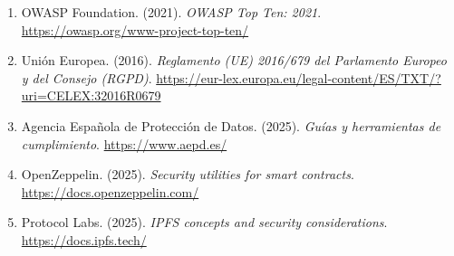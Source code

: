 \documentclass[11pt, a4paper]{article}
\begin{document}
\begin{enumerate}
    \item OWASP Foundation. (2021). \textit{OWASP Top Ten: 2021}. \url{https://owasp.org/www-project-top-ten/}
    \item Unión Europea. (2016). \textit{Reglamento (UE) 2016/679 del Parlamento Europeo y del Consejo (RGPD)}. \url{https://eur-lex.europa.eu/legal-content/ES/TXT/?uri=CELEX:32016R0679}
    \item Agencia Española de Protección de Datos. (2025). \textit{Guías y herramientas de cumplimiento}. \url{https://www.aepd.es/}
    \item OpenZeppelin. (2025). \textit{Security utilities for smart contracts}. \url{https://docs.openzeppelin.com/}
    \item Protocol Labs. (2025). \textit{IPFS concepts and security considerations}. \url{https://docs.ipfs.tech/}
\end{enumerate}
\end{document}
